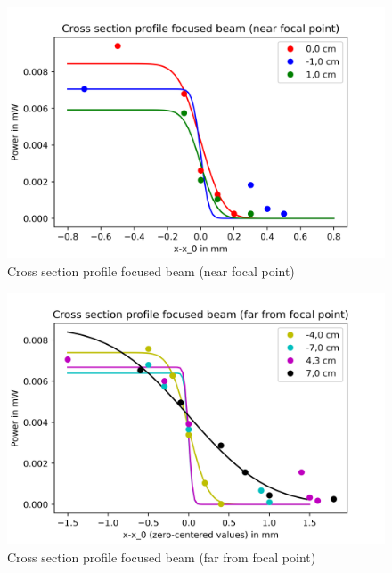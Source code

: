 \documentclass{article}
\begin{document}
\begin{figure}[h!]
\includegraphics[width=\textwidth]{Cross section profile focused beam (near focal point).png} 
\caption{Cross section profile focused beam (near focal point)}
\label{near_focal} 
\end{figure}

\begin{figure}[h!]
\includegraphics[width=\textwidth]{Cross section profile focused beam (far from focal point).png}
\caption{Cross section profile focused beam (far from focal point)}
\label{far_focal}
\end{figure}
\end{document}
